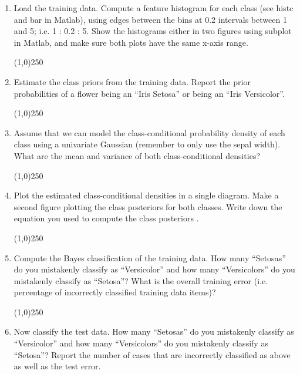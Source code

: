 \documentclass[12pt]{article}
\begin{document}
\begin{enumerate}
\item Load the training data. Compute a feature histogram for each class (see histc and bar in Matlab), using edges between the bins at 0.2 intervals between 1 and 5; i.e. 1 : 0.2 : 5. Show the histograms either in two figures using subplot in Matlab, and make sure both plots have the same x-axis range.\\

\begin{center}
\line(1,0){250}
\end{center}

\item Estimate the class priors from the training data. Report the prior probabilities of a flower being an “Iris Setosa” or being an “Iris Versicolor”.\\

\begin{center}
\line(1,0){250}
\end{center}

\item Assume that we can model the class-conditional probability density of each class using a univariate Gaussian (remember to only use the sepal width). What are the mean and variance of both class-conditional densities?\\

\begin{center}
\line(1,0){250}
\end{center}

\item Plot the estimated class-conditional densities in a single diagram. Make a second figure plotting the class posteriors for both classes. Write down the equation you used to compute the class posteriors .\\

\begin{center}
\line(1,0){250}
\end{center}

\item Compute the Bayes classification of the training data. How many “Setosas” do you mistakenly classify as “Versicolor” and how many “Versicolors” do you mistakenly classify as “Setosa”? What is the overall training error (i.e. percentage of incorrectly classified training data items)?\\

\begin{center}
\line(1,0){250}
\end{center}

\item Now classify the test data. How many “Setosas” do you mistakenly classify as “Versicolor” and how many “Versicolors” do you mistakenly classify as “Setosa”? Report the number of cases that are incorrectly classified as above as well as the test error.\\

\end{enumerate}
\end{document}
